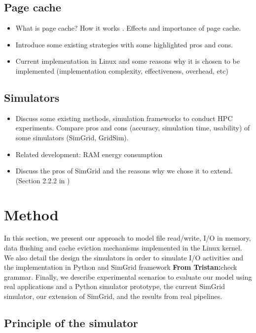 \documentclass[conference]{IEEEtran}
\newcommand{\tristan}[1]{\color{orange}\textbf{From Tristan:}#1\color{black}}
\begin{document}
		\subsection{Page cache}
			\begin{itemize}
				\item What is page cache? How it works \cite{linuxdev3rd2010}. Effects and importance of page cache.
				\item Introduce some existing strategies with some highlighted pros and cons.
				\item Current implementation in Linux and some reasons why it is chosen to be implemented (implementation complexity, effectiveness, overhead, etc) \cite{linuxdev3rd2010}
			\end{itemize}									

		\subsection{Simulators}
			\begin{itemize}
				\item Discuss some existing methods, simulation frameworks to conduct HPC experiments. Compare pros and cons (accuracy, simulation time, usability) of some simulators (SimGrid, GridSim).
				\item Related development: RAM energy consumption \cite{gill2019} \cite{ouarnoughi2017} 
				\item Discuss the pros of SimGrid and the reasons why we chose it to extend. (Section 2.2.2 in \cite{casanova2014})
			\end{itemize}
			
	\section{Method}
		In this section, we present our approach to model file read/write, 
		I/O in memory, data flushing and cache eviction mechanisms 
		implemented in the Linux kernel. 
		We also detail the design the simulators in order to simulate I/O activities 
		and the implementation in Python and SimGrid framework \tristan{check grammar}. 
		Finally, we describe experimental scenarios to evaluate our model using real applications and
		a Python simulator prototype, the current SimGrid simulator, our extension of SimGrid, and the results from real pipelines.

		\subsection{Principle of the simulator}
	
\end{document}

